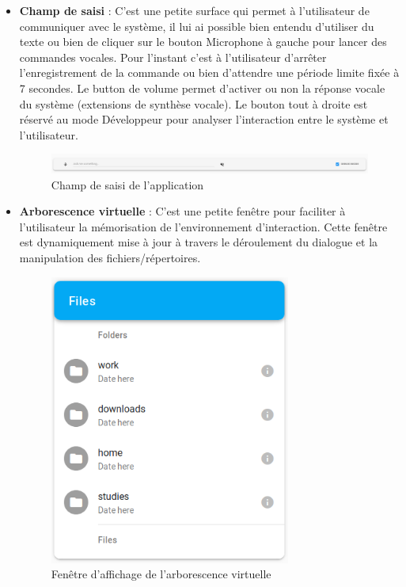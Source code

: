 \begin{itemize}
	\item \textbf{Champ de saisi} : C'est une petite surface qui permet à l'utilisateur de communiquer avec le système, il lui ai possible bien entendu d'utiliser du texte ou bien de cliquer sur le bouton Microphone à gauche pour lancer des commandes vocales. Pour l'instant c'est à l'utilisateur d'arrêter l'enregistrement de la commande ou bien d'attendre une période limite fixée à 7 secondes. Le button de volume permet d'activer ou non la réponse vocale du système (extensions de synthèse vocale). Le bouton tout à droite est réservé au mode Développeur pour analyser l'interaction entre le système et l'utilisateur.
	\begin{figure}[H]
		\centering
		\includegraphics[width=.9\linewidth]{images/Realisation/app_bar.png} 
		\caption{Champ de saisi de l'application}
	\end{figure} 
	
	\item \textbf{Arborescence virtuelle} : C'est une petite fenêtre pour faciliter à l'utilisateur la mémorisation de l'environnement d'interaction. Cette fenêtre est dynamiquement mise à jour à travers le déroulement du dialogue et la manipulation des fichiers/répertoires.
	
	\begin{figure}[H]
		\centering
		\includegraphics[width=.4\linewidth]{images/Realisation/app_browser.png}
		\caption{Fenêtre d'affichage de l'arborescence virtuelle}
	\end{figure} 
	

\end{itemize}
